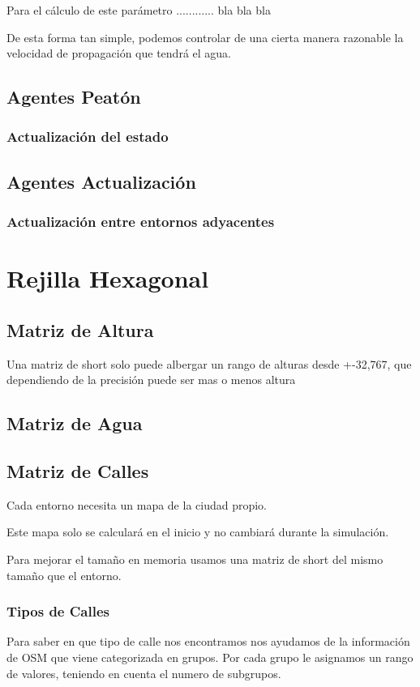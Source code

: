 Para el cálculo de este parámetro ............ bla bla bla %

De esta forma tan simple, podemos controlar de una cierta manera razonable la
velocidad de propagación que tendrá el agua.

\subsection*{Agentes Peatón}
\subsubsection*{Actualización del estado}
\subsection*{Agentes Actualización}
\subsubsection*{Actualización entre entornos adyacentes}
\section*{Rejilla Hexagonal}
\subsection*{Matriz de Altura}
Una matriz de short solo puede albergar un rango de alturas desde +-32,767, que
dependiendo de la precisión puede ser mas o menos altura
\subsection*{Matriz de Agua}
\subsection*{Matriz de Calles}
Cada entorno necesita un mapa de la ciudad propio.

Este mapa solo se calculará en el inicio y no cambiará durante la simulación.

Para mejorar el tamaño en memoria usamos una matriz de short del mismo tamaño
que el entorno.
\subsubsection*{Tipos de Calles}
Para saber en que tipo de calle nos encontramos nos ayudamos de la información
de OSM que viene categorizada en grupos. Por cada grupo le asignamos un rango
de valores, teniendo en cuenta el numero de subgrupos.

